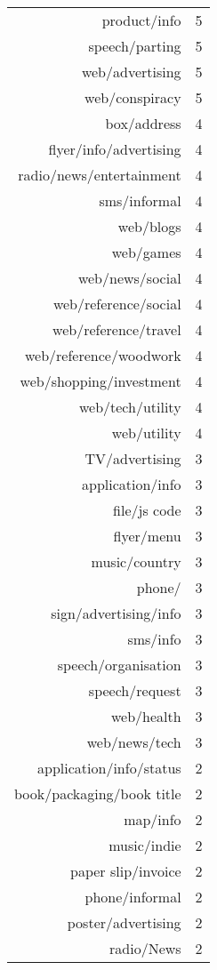 \begin{table}[ht]
\begin{tabular}{rr}
      product/info &   5 \\ 
      speech/parting &   5 \\ 
      web/advertising &   5 \\ 
      web/conspiracy &   5 \\ 
      box/address &   4 \\ 
      flyer/info/advertising &   4 \\ 
      radio/news/entertainment &   4 \\ 
      sms/informal &   4 \\ 
      web/blogs &   4 \\ 
      web/games &   4 \\ 
      web/news/social &   4 \\ 
      web/reference/social &   4 \\ 
      web/reference/travel &   4 \\ 
      web/reference/woodwork &   4 \\ 
      web/shopping/investment &   4 \\ 
      web/tech/utility &   4 \\ 
      web/utility &   4 \\ 
      TV/advertising &   3 \\ 
      application/info &   3 \\ 
      file/js code &   3 \\ 
      flyer/menu &   3 \\ 
      music/country &   3 \\ 
      phone/ &   3 \\ 
      sign/advertising/info &   3 \\ 
      sms/info &   3 \\ 
      speech/organisation &   3 \\ 
      speech/request &   3 \\ 
      web/health &   3 \\ 
      web/news/tech &   3 \\ 
      application/info/status &   2 \\ 
      book/packaging/book title &   2 \\ 
      map/info &   2 \\ 
      music/indie &   2 \\ 
      paper slip/invoice &   2 \\ 
      phone/informal &   2 \\ 
      poster/advertising &   2 \\ 
      radio/News &   2 \\ 

\end{tabular}
\end{table}
